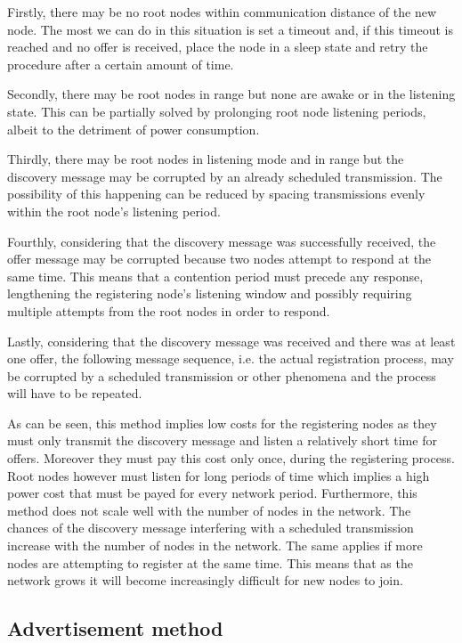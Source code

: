 Firstly, there may be no root nodes
within communication distance of the new node. The most we can do in this situation is
set a timeout and, if this timeout is reached and no offer is received, place
the node in a sleep state and retry the procedure after a certain amount of
time.

Secondly, there may be root nodes in range but none are awake or in the
listening state. This can be partially solved by prolonging root node listening
periods, albeit to the detriment of power consumption.

Thirdly, there may be
root nodes in listening mode and in range but the discovery message may be
corrupted by an already scheduled transmission. The possibility of this
happening can be reduced by spacing transmissions evenly within the root node's
listening period.

Fourthly, considering that the discovery message was
successfully received, the offer message may be corrupted because two nodes
attempt to respond at the same time. This means that a contention period must
precede any response, lengthening the registering node's listening window and
possibly requiring multiple attempts from the root nodes in order to
respond.

Lastly, considering that the discovery message was received and there
was at least one offer, the following message sequence, i.e. the actual
registration process, may be corrupted by a scheduled transmission or other
phenomena and the process will have to be repeated.

As can be seen, this method implies low costs for the registering nodes as they
must only transmit the discovery message and listen a relatively short time for
offers. Moreover they must pay this cost only once, during the registering process.
Root nodes however must listen for long periods of time which implies a high
power cost that must be payed for every network period. Furthermore, this method
does not scale well with the number of nodes in the network. The chances of the
discovery message interfering with a scheduled transmission increase with the
number of nodes in the network. The same applies if more nodes are attempting
to register at the same time. This means that as the network grows it will
become increasingly difficult for new nodes to join.

\subsection{Advertisement method}
\label{subsec:advertisement_method}

